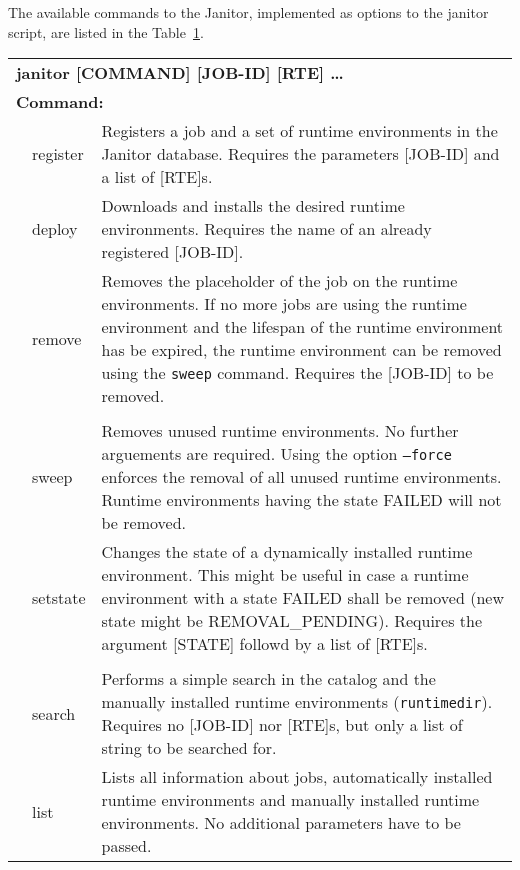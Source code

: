The available commands to the Janitor, implemented as options to the janitor script, are listed
in the Table~\ref{tab:janitor_commandline_man}.

\begin{table}[!h]
   \begin{center}
        \label{tab:janitor_commandline_man}
	\begin{tabular}{p{0.5cm}p{2cm}p{11cm}}
	\multicolumn{3}{l}{\textbf{janitor [COMMAND] [JOB-ID] [RTE] \dots}} \\
	\multicolumn{3}{l}{\textbf{Command:}}\\
	&	register & Registers a job and a set of runtime
			   environments in the Janitor database.
			   Requires the parameters [JOB-ID] and a list of [RTE]s.\\
	&	deploy	 & Downloads and installs the desired
			   runtime environments. Requires the name
			   of an already registered [JOB-ID].\\
	&	remove	 & Removes the placeholder of the job on the runtime environments.
			   If no more jobs are using the runtime environment and the
			   lifespan of the runtime environment has be expired, the runtime
			   environment can be removed using the \texttt{sweep} command.
			   Requires the [JOB-ID] to be removed.\\
	&		 &\\
	&	sweep	 & Removes unused runtime environments. No further arguements are required.
			   Using the option \texttt{--force} enforces the removal of all unused
			   runtime environments. Runtime environments having the state FAILED will
			   not be removed.\\
	&	setstate & Changes the state of a dynamically installed runtime environment.
			   This might be useful in case a runtime environment with a state FAILED
			   shall be removed (new state might be REMOVAL\_PENDING). Requires the argument
			   [STATE] followd by a list of [RTE]s.\\
	&		 &\\
	&	search	 & Performs a simple search in the catalog and the manually installed
			   runtime environments (\texttt{runtimedir}). Requires no [JOB-ID] nor [RTE]s,
			   but only a list of string to be searched for.\\
	&	list	 & Lists all information about jobs, automatically installed runtime
			   environments and manually installed runtime environments.
			   No additional parameters have to be passed.\\

\end{tabular}
\end{center}
\end{table}
